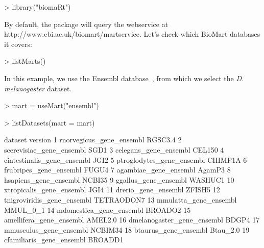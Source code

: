 \begin{Schunk}
\begin{Sinput}
> library("biomaRt")
\end{Sinput}
\end{Schunk}
%
By default, the  package will query the webservice at\newline 
http://www.ebi.ac.uk/biomart/martservice.  Let's check
which BioMart databases it covers:
%
\begin{Schunk}
\begin{Sinput}
> listMarts()
\end{Sinput}
\end{Schunk}
%
In this example, we use the Ensembl database~\cite{Ensembl2006}, from
which we select the \textit{D. melanogaster} dataset.
%
\begin{Schunk}
\begin{Sinput}
> mart = useMart("ensembl")
\end{Sinput}
\end{Schunk}
% 
\begin{Schunk}
\begin{Sinput}
> listDatasets(mart = mart)
\end{Sinput}
\begin{Soutput}
                      dataset    version
1    rnorvegicus_gene_ensembl    RGSC3.4
2    scerevisiae_gene_ensembl       SGD1
3       celegans_gene_ensembl     CEL150
4  cintestinalis_gene_ensembl       JGI2
5   ptroglodytes_gene_ensembl    CHIMP1A
6      frubripes_gene_ensembl      FUGU4
7       agambiae_gene_ensembl     AgamP3
8       hsapiens_gene_ensembl     NCBI35
9        ggallus_gene_ensembl    WASHUC1
10   xtropicalis_gene_ensembl       JGI4
11        drerio_gene_ensembl     ZFISH5
12 tnigroviridis_gene_ensembl TETRAODON7
13      mmulatta_gene_ensembl   MMUL_0_1
14    mdomestica_gene_ensembl    BROADO2
15    amellifera_gene_ensembl    AMEL2.0
16 dmelanogaster_gene_ensembl      BDGP4
17     mmusculus_gene_ensembl    NCBIM34
18       btaurus_gene_ensembl   Btau_2.0
19   cfamiliaris_gene_ensembl    BROADD1
\end{Soutput}
\end{Schunk}
